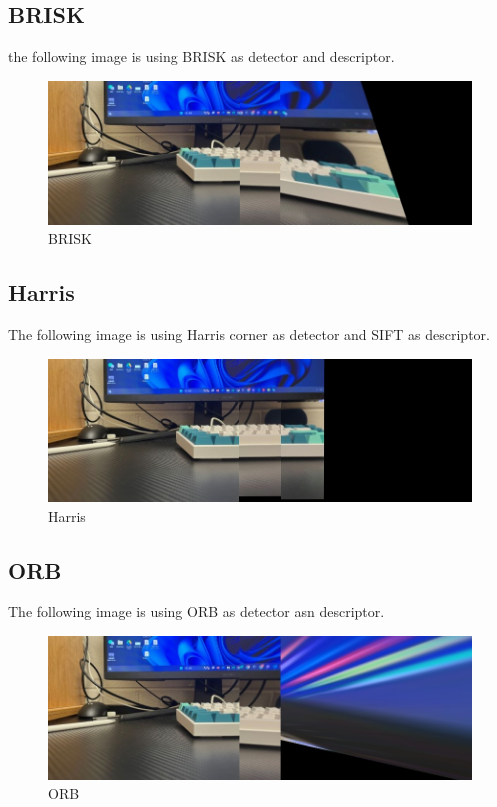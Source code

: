\documentclass{article}
\begin{document}
\subsection*{BRISK}
the following image is using BRISK as detector and descriptor.
\begin{figure}[ht!]
  \begin{center}
    \includegraphics[scale=0.4]{BRISK-result.jpg}
    \caption[short]{BRISK}
    \label{fig:brisk}
  \end{center} 
\end{figure}
\subsection*{Harris}
The following image is using Harris corner as detector and SIFT as descriptor.
\begin{figure}[ht!]
  \begin{center}
    \includegraphics[scale=0.4]{Harris-result.jpg}
    \caption[short]{Harris}
    \label{fig:harris}
  \end{center} 
\end{figure}

\subsection*{ORB}
The following image is using ORB as detector asn descriptor.
\begin{figure}[ht!]
  \begin{center}
    \includegraphics[scale=0.4]{ORB-result.jpg}
    \caption[short]{ORB}
    \label{fig:orb}
  \end{center} 
\end{figure}
\end{document}
